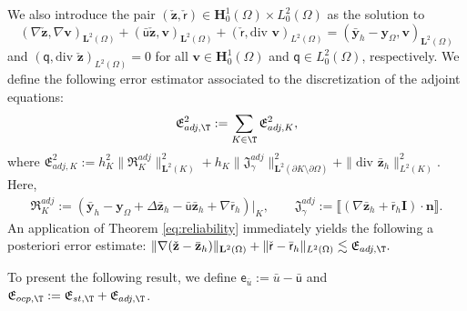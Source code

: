 \documentclass[final]{siamart0216}
\begin{document}
We also introduce the pair $(\check{\mathbf{z}},\check{\mathsf{r}})\in\mathbf{H}_0^1(\Omega)\times L_0^2(\Omega)$ as the solution to 
\begin{equation}\label{eq:brinkamn_problem_adjoint_aux_semi}
(\nabla \check{\mathbf{z}},\nabla \mathbf{v})_{\mathbf{L}^2(\Omega)}+( \bar{\mathsf{u}}\check{\mathbf{z}}, \mathbf{v})_{\mathbf{L}^2(\Omega)}+(\check{\mathsf{r}},\text{div }\mathbf{v})_{L^2(\Omega)} = (\bar{\mathbf{y}}_{h}-\mathbf{y}_{\Omega},\mathbf{v})_{\mathbf{L}^2(\Omega)}
\end{equation}
and $(\mathsf{q},\text{div }\check{\mathbf{z}})_{L^2(\Omega)}  =  0$ for all $\mathbf{v} \in \mathbf{H}_0^1(\Omega)$ and $\mathsf{q} \in L_0^2(\Omega)$, respectively.
We define the following error estimator associated to the discretization of the adjoint equations:
\begin{equation*}\label{eq:estimator_AD_semi}
\mathfrak{E}_{adj,\T}^2:= \sum_{K\in\T}\mathfrak{E}_{adj,K}^2, 
\end{equation*}
where $\mathfrak{E}_{adj,K}^2:=h_K^2  \|\mathfrak{R}_{K}^{adj}\|_{\mathbf{L}^2(K)}^2+h_K  \|\mathfrak{J}_{\gamma}^{adj}\|_{\mathbf{L}^2(\partial K\setminus\partial \Omega)}^2+\|\text{div }\bar{\mathbf{z}}_{h}\|_{L^2(K)}^2$. Here,
\begin{align*}\label{eq:residual_adjoint_semi}
\mathfrak{R}_{K}^{adj} := (\bar{\mathbf{y}}_{h}-\mathbf{y}_{\Omega}+\Delta \bar{\mathbf{z}}_{h} -\bar{\mathsf{u}}\bar{\mathbf{z}}_{h} + \nabla\bar{\mathsf{r}}_{h})|_K,
\qquad \mathfrak{J}_{\gamma}^{adj} := \llbracket(\nabla \bar{\mathbf{z}}_{h} +\bar{\mathsf{r}}_{h}\mathbf{I})\cdot \mathbf{n}\rrbracket.
\end{align*}
An application of Theorem \ref{eq:reliability} immediately yields the following a posteriori error estimate:
$
\|\nabla(\check{\mathbf{z}}-\bar{\mathbf{z}}_{h})\|_{\mathbf{L}^2(\Omega)} +\|\check{\mathsf{r}}-\bar{\mathsf{r}}_{h}\|_{L^2(\Omega)} \lesssim \mathfrak{E}_{adj,\T}.
$

To present the following result, we define $\mathsf{e}_{\bar{u}}:=\bar{u}-\bar{\mathsf{u}}$ and $\mathfrak{E}_{ocp,\T}:=\mathfrak{E}_{st,\T}+\mathfrak{E}_{adj,\T}$.
\end{document}
